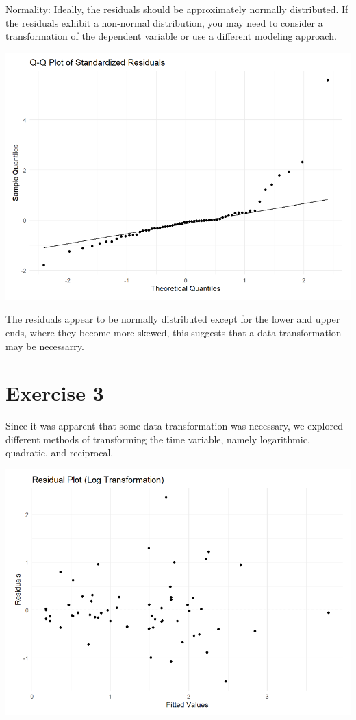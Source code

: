 \documentclass{article}
\begin{document}
Normality: Ideally, the residuals should be approximately normally distributed. If the residuals exhibit a non-normal distribution, you may need to consider a transformation of the dependent variable or use a different modeling approach.

\begin{center}
\includegraphics[scale=0.5]{graphs/qq-residuals.png}
\end{center}

The residuals appear to be normally distributed except for the lower and upper ends, where they become more skewed, this suggests that a data transformation may be necessarry.


\section{Exercise 3}

Since it was apparent that some data transformation was necessary, we explored different methods of transforming the time variable, namely logarithmic, quadratic, and reciprocal.

\begin{center}
\includegraphics[scale=0.5]{graphs/graph-log.png}
\end{center}
\end{document}
